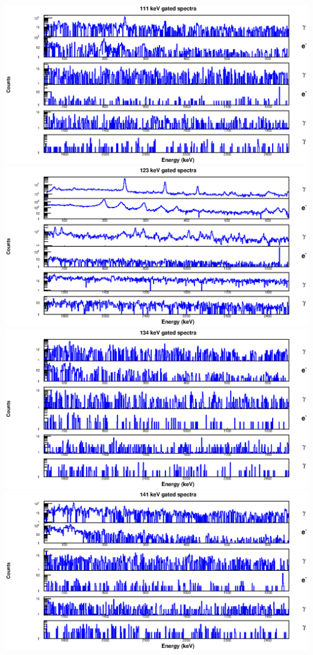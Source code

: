 \begin{landscape}
\includegraphics[scale=1.2]{154Gd_Appendix/111_combined.eps}
\includegraphics[scale=1.2]{154Gd_Appendix/123_combined.eps}
\includegraphics[scale=1.2]{154Gd_Appendix/134_combined.eps}
\includegraphics[scale=1.2]{154Gd_Appendix/141_combined.eps}

\end{landscape}
